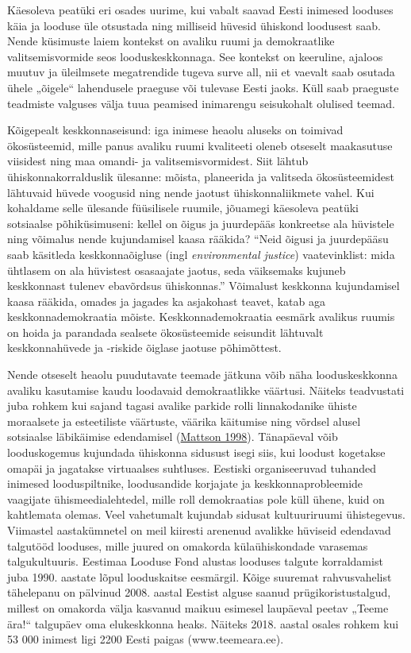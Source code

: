 \documentclass[estonian,]{article}
\begin{document}
Käesoleva peatüki eri osades uurime, kui vabalt saavad Eesti inimesed looduses käia ja looduse üle otsustada ning milliseid hüvesid ühiskond loodusest saab. Nende küsimuste laiem kontekst on avaliku ruumi ja demokraatlike valitsemisvormide seos looduskeskkonnaga. See kontekst on keeruline, ajaloos muutuv ja üleilmsete megatrendide tugeva surve all, nii et vaevalt saab osutada ühele „õigele`` lahendusele praeguse või tulevase Eesti jaoks. Küll saab praeguste teadmiste valguses välja tuua peamised inimarengu seisukohalt olulised teemad.

Kõigepealt keskkonnaseisund: iga inimese heaolu aluseks on toimivad ökosüsteemid, mille panus avaliku ruumi kvaliteeti oleneb otseselt maakasutuse viisidest ning maa omandi- ja valitsemisvormidest. Siit lähtub ühiskonnakorralduslik ülesanne: mõista, planeerida ja valitseda ökosüsteemidest lähtuvaid hüvede voogusid ning nende jaotust ühiskonnaliikmete vahel. Kui kohaldame selle ülesande füüsilisele ruumile, jõuamegi käesoleva peatüki sotsiaalse põhiküsimuseni: kellel on õigus ja juurdepääs konkreetse ala hüvistele ning võimalus nende kujundamisel kaasa rääkida? ``Neid õigusi ja juurdepääsu saab käsitleda keskkonnaõigluse (ingl \emph{environmental justice}) vaatevinklist: mida ühtlasem on ala hüvistest osasaajate jaotus, seda väiksemaks kujuneb keskkonnast tulenev ebavõrdsus ühiskonnas.'' Võimalust keskkonna kujundamisel kaasa rääkida, omades ja jagades ka asjakohast teavet, katab aga keskkonnademokraatia mõiste. Keskkonnademokraatia eesmärk avalikus ruumis on hoida ja parandada sealsete ökosüsteemide seisundit lähtuvalt keskkonnahüvede ja -riskide õiglase jaotuse põhimõttest.

Nende otseselt heaolu puudutavate teemade jätkuna võib näha looduskeskkonna avaliku kasutamise kaudu loodavaid demokraatlikke väärtusi. Näiteks teadvustati juba rohkem kui sajand tagasi avalike parkide rolli linnakodanike ühiste moraalsete ja esteetiliste väärtuste, väärika käitumise ning võrdsel alusel sotsiaalse läbikäimise edendamisel (\protect\hyperlink{Mattson1998}{Mattson 1998}). Tänapäeval võib looduskogemus kujundada ühiskonna sidusust isegi siis, kui loodust kogetakse omapäi ja jagatakse virtuaalses suhtluses. Eestiski organiseeruvad tuhanded inimesed looduspiltnike, loodusandide korjajate ja keskkonnaprobleemide vaagijate ühismeedialehtedel, mille roll demokraatias pole küll ühene, kuid on kahtlemata olemas. Veel vahetumalt kujundab sidusat kultuuriruumi ühistegevus. Viimastel aastakümnetel on meil kiiresti arenenud avalikke hüviseid edendavad talgutööd looduses, mille juured on omakorda külaühiskondade varasemas talgukultuuris. Eestimaa Looduse Fond alustas looduses talgute korraldamist juba 1990. aastate lõpul looduskaitse eesmärgil. Kõige suuremat rahvusvahelist tähelepanu on pälvinud 2008. aastal Eestist alguse saanud prügikoristustalgud, millest on omakorda välja kasvanud maikuu esimesel laupäeval peetav „Teeme ära!`` talgupäev oma elukeskkonna heaks. Näiteks 2018. aastal osales rohkem kui 53 000 inimest ligi 2200 Eesti paigas (www.teemeara.ee).
\end{document}
